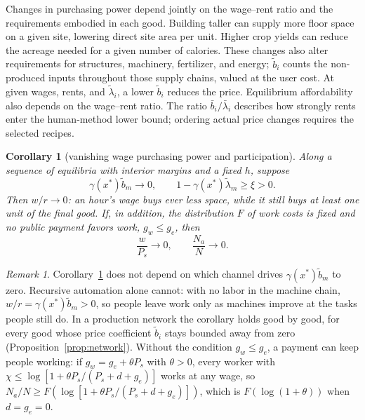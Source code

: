 \documentclass[12pt]{article}
\theoremstyle{plain}
\newtheorem{corollary}{Corollary}
\theoremstyle{definition}
\theoremstyle{remark}
\newtheorem*{remark}{Remark}
\begin{document}
Changes in purchasing power depend jointly on the wage--rent ratio and the requirements embodied in each good. Building taller can supply more floor space on a given site, lowering direct site area per unit. Higher crop yields can reduce the acreage needed for a given number of calories. These changes also alter requirements for structures, machinery, fertilizer, and energy; $\widetilde b_i$ counts the non-produced inputs throughout those supply chains, valued at the user cost. At given wages, rents, and $\widetilde\lambda_i$, a lower $\widetilde b_i$ reduces the price. Equilibrium affordability also depends on the wage--rent ratio. The ratio $\bar b_i/\bar\lambda_i$ describes how strongly rents enter the human-method lower bound; ordering actual price changes requires the selected recipes.

\begin{corollary}[vanishing wage purchasing power and participation]\label{cor:vanishing}
Along a sequence of equilibria with interior margins and a fixed $h$, suppose
\[
\gamma(x^*)\widetilde b_m\to0,\qquad
1-\gamma(x^*)\widetilde\lambda_m\ge\xi>0.
\]
Then $w/r\to0$: an hour's wage buys ever less space, while it still buys at least one unit of the final good. If, in addition, the distribution $F$ of work costs is fixed and no public payment favors work, $g_w\le g_e$, then
\begin{equation}\label{eq:14}
\frac{w}{P_s}\to0,\qquad
\frac{N_a}{N}\to0.
\end{equation}
\end{corollary}

\begin{remark}
Corollary~\ref{cor:vanishing} does not depend on which channel drives $\gamma(x^*)\widetilde b_m$ to zero. Recursive automation alone cannot: with no labor in the machine chain, $w/r=\gamma(x^*)\widetilde b_m>0$, so people leave work only as machines improve at the tasks people still do. In a production network the corollary holds good by good, for every good whose price coefficient $\widetilde b_i$ stays bounded away from zero (Proposition~\ref{prop:network}). Without the condition $g_w\le g_e$, a payment can keep people working: if $g_w=g_e+\theta P_s$ with $\theta>0$, every worker with $\chi\le\log[1+\theta P_s/(P_s+d+g_e)]$ works at any wage, so $N_a/N\ge F(\log[1+\theta P_s/(P_s+d+g_e)])$, which is $F(\log(1+\theta))$ when $d=g_e=0$.
\end{remark}
\end{document}
